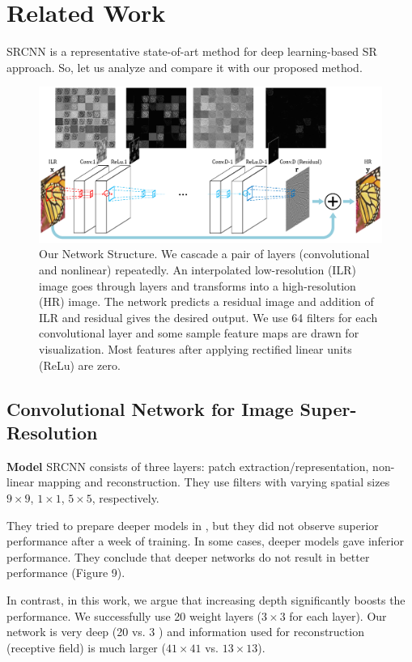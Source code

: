 \documentclass[10pt,twocolumn,letterpaper]{article}
\begin{document}
\section{Related Work}
SRCNN is a representative state-of-art method for deep learning-based SR approach. So, let us analyze and compare it with our proposed method.
\begin{figure}[t]
\includegraphics[width=\textwidth]{figs/fig2_sffsr.pdf}
\caption{Our Network Structure. We cascade a pair of layers (convolutional and nonlinear) repeatedly. An interpolated low-resolution (ILR) image goes through layers and transforms into a high-resolution (HR) image. The network predicts a residual image and addition of ILR and residual gives the desired output. We use 64 filters for each convolutional layer and some sample feature maps are drawn for visualization. Most features after applying rectified linear units (ReLu) are zero.}
\label{fig:network}
\end{figure}

\subsection{Convolutional Network for Image Super-Resolution}
\textbf{Model}
SRCNN consists of three layers: patch extraction/representation, non-linear mapping and reconstruction. They use filters with varying spatial sizes $9\times9$, $1\times1$, $5\times5$, respectively. 

They tried to prepare deeper models in \cite{dong2015image}, but they did not observe superior performance after a week of training. In some cases, deeper models gave inferior performance. They conclude that deeper networks do not result in better performance (Figure 9).

In contrast, in this work, we argue that increasing depth significantly boosts the performance. We successfully use 20 weight layers ($3\times3$ for each layer). Our network is very deep (20 vs. 3 \cite{dong2015image}) and information used for reconstruction (receptive field) is much larger ($41\times41$ vs. $13\times13$).
\end{document}
